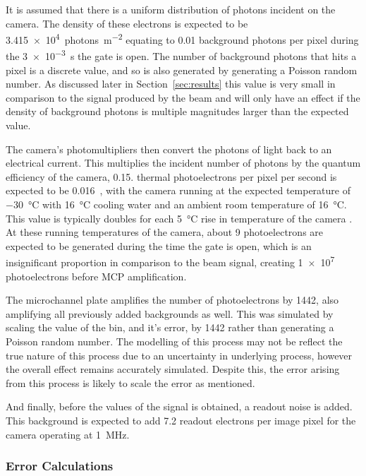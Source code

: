 It is assumed that there is a uniform distribution of photons incident on the
camera. The density of these electrons is expected to be
\SI{3.415e4}{photons\per\meter\squared} equating to \num{0.01} background
photons per pixel during the \SI{3e-3}{\second} the gate is open. The number of
background photons that hits a pixel is a discrete value, and so is also
generated by generating a Poisson random number.  As discussed later in
Section~\ref{sec:results} this value is very small in comparison to the signal
produced by the beam and will only have an effect if the density of background
photons is multiple magnitudes larger than the expected value.

The camera's photomultipliers then convert the photons of light back to an
electrical current. This multiplies the incident number of photons by the
quantum efficiency of the camera, \num{0.15}. %
thermal photoelectrons per pixel per second is expected to be
\num{0.016}~\cite{istarscmos}, with the camera running at the expected
temperature of \SI{-30}{\celsius} with \SI{16}{\celsius} cooling water and an
ambient room temperature of \SI{16}{\celsius}. This value is typically doubles
for each \SI{5}{\celsius} rise in temperature of the camera \cite{istarscmos}.
At these running temperatures of the camera, about 9 photoelectrons are expected
to be generated during the time the gate is open, which is an insignificant
proportion in comparison to the beam signal, creating \num{1e7} photoelectrons
before MCP amplification.

The microchannel plate amplifies the number of photoelectrons by \num{1442},
also amplifying all previously added backgrounds as well. This was simulated by
scaling the value of the bin, and it's error, by \num{1442} rather than
generating a Poisson random number. The modelling of this process may not be
reflect the true nature of this process due to an uncertainty in underlying
process, however the overall effect remains accurately simulated. Despite this,
the error arising from this process is likely to scale the error as mentioned.

And finally, before the values of the signal is obtained, a readout noise is
added. This background is expected to add \num{7.2} readout electrons per image
pixel for the camera operating at \SI{1}{\mega\hertz}.

\subsubsection{Error Calculations}

